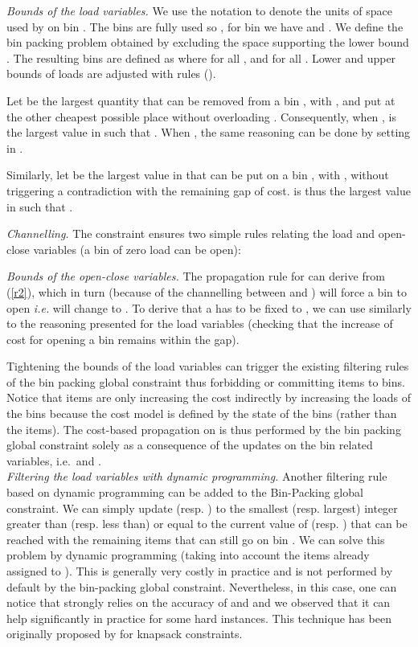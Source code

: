 \noindent\emph{Bounds of the load variables.} 
We use the notation  to denote the units of space used by   on bin . The bins  are fully used so , for bin  we have  and .
We define the bin packing problem  obtained by excluding the space supporting the lower bound . 
 The resulting bins are defined as  where  for all ,  and  for all . Lower and upper bounds  of loads are adjusted with rules (). 




Let  be the largest quantity that can be removed from a bin , with ,
and put at the other cheapest possible place without overloading . Consequently, when ,  is the largest value in  such that . When , the same reasoning can be done by setting  in . 

Similarly, let  be the largest value in  that can  be put on a bin , with , without triggering a contradiction with the remaining gap of cost.  is thus the largest value in  such that .

\noindent\emph{Channelling.} The constraint ensures two simple rules relating the load and open-close variables (a bin of zero load can be open):



\smallskip\noindent\emph{Bounds of the open-close variables.} The propagation rule  for  can derive  from (\ref{r2}), which in turn (because of the channelling between  and ) will force a bin to open \emph{i.e.}    will change  to . To derive that a  has to be fixed to , we can use  similarly to the reasoning presented for the load variables (checking that the increase of cost for opening a bin remains within the gap). 

Tightening the bounds of the load variables can trigger the existing filtering rules of the bin packing global constraint thus forbidding or committing items to bins. Notice that items are only increasing the cost indirectly by increasing the loads of the bins because the cost model is defined by the state of the bins (rather than the items). The cost-based propagation on  is thus performed by the bin packing global constraint solely as a consequence of the updates on the bin related variables, i.e.\  and .\\

\smallskip\noindent\emph{Filtering the load variables with dynamic programming.} Another filtering rule based on dynamic programming can be added to the Bin-Packing global constraint. We can simply update  (resp. ) to the smallest (resp. largest) integer greater than (resp. less than) or equal to the current value of  (resp. ) that can be reached with the remaining items that can still go on bin . We can solve this problem by dynamic programming (taking into account the items already assigned to ). This is generally  very costly in practice and is not performed by default by the bin-packing global constraint. Nevertheless, in this case, one can notice that  strongly relies on the accuracy of    and  and we observed that it can help significantly in practice for some hard instances. This technique has been originally proposed by \cite{DBLP:journals/anor/Trick03} for knapsack constraints. \\

